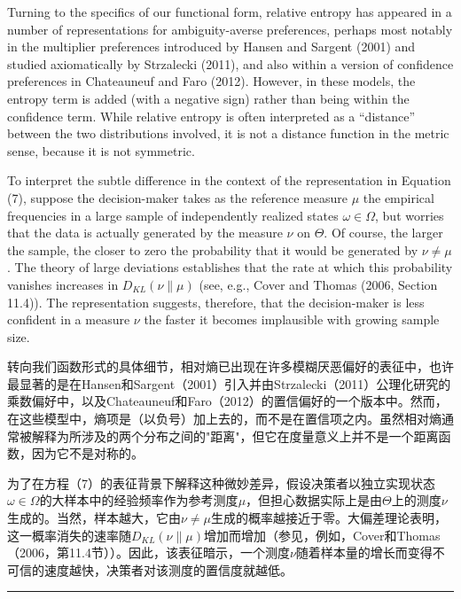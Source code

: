 \documentclass[12pt,a4paper]{article}
\newenvironment{original}
  {\par\noindent\color{black}\smallskip}
  {\par\smallskip}
\newenvironment{translation}
  {\par\noindent\color{blue!70!black}\smallskip}
  {\par\medskip\hrule\medskip}
\begin{document}
\begin{original}
Turning to the specifics of our functional form, relative entropy has appeared in a number of representations for ambiguity-averse preferences, perhaps most notably in the multiplier preferences introduced by Hansen and Sargent (2001) and studied axiomatically by Strzalecki (2011), and also within a version of confidence preferences in Chateauneuf and Faro (2012). However, in these models, the entropy term is added (with a negative sign) rather than being within the confidence term. While relative entropy is often interpreted as a ``distance'' between the two distributions involved, it is not a distance function in the metric sense, because it is not symmetric.

To interpret the subtle difference in the context of the representation in Equation (7), suppose the decision-maker takes as the reference measure $\mu$ the empirical frequencies in a large sample of independently realized states $\omega \in \Omega$, but worries that the data is actually generated by the measure $\nu$ on $\Theta$. Of course, the larger the sample, the closer to zero the probability that it would be generated by $\nu \neq \mu$. The theory of large deviations establishes that the rate at which this probability vanishes increases in $D_{KL}(\nu\|\mu)$ (see, e.g., Cover and Thomas (2006, Section 11.4)). The representation suggests, therefore, that the decision-maker is less confident in a measure $\nu$ the faster it becomes implausible with growing sample size.
\end{original}
\begin{translation}
转向我们函数形式的具体细节，相对熵已出现在许多模糊厌恶偏好的表征中，也许最显著的是在Hansen和Sargent（2001）引入并由Strzalecki（2011）公理化研究的乘数偏好中，以及Chateauneuf和Faro（2012）的置信偏好的一个版本中。然而，在这些模型中，熵项是（以负号）加上去的，而不是在置信项之内。虽然相对熵通常被解释为所涉及的两个分布之间的"距离"，但它在度量意义上并不是一个距离函数，因为它不是对称的。

为了在方程（7）的表征背景下解释这种微妙差异，假设决策者以独立实现状态$\omega \in \Omega$的大样本中的经验频率作为参考测度$\mu$，但担心数据实际上是由$\Theta$上的测度$\nu$生成的。当然，样本越大，它由$\nu \neq \mu$生成的概率越接近于零。大偏差理论表明，这一概率消失的速率随$D_{KL}(\nu\|\mu)$增加而增加（参见，例如，Cover和Thomas（2006，第11.4节））。因此，该表征暗示，一个测度$\nu$随着样本量的增长而变得不可信的速度越快，决策者对该测度的置信度就越低。
\end{translation}
\end{document}
